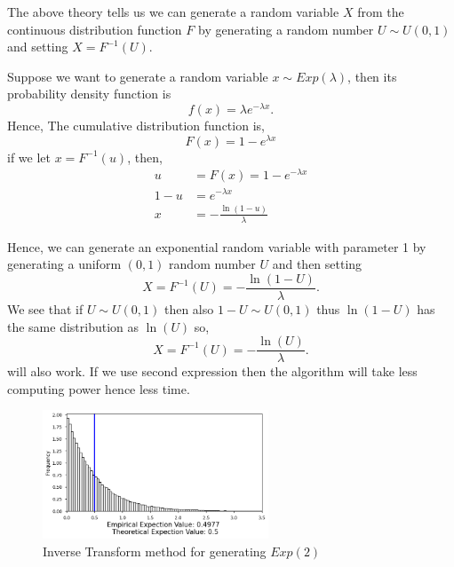 The above theory tells us we can generate a random variable $X$ from the continuous distribution function  $F$ by generating a random number $U\sim U(0,1)$
and setting $X=F^{-1}(U)$.

\begin{example}
	\label{exponential distribution}
	Suppose we want to generate a random variable $x\sim Exp(\lambda)$, then its probability density function is
	\[
		f(x) = \lambda e^{-\lambda x}.
	\]
	Hence, The cumulative distribution function is,
	\[
		F(x) = 1-e^{\lambda x}
	\]
	if we let $x=F^{-1}(u)$, then,
	\begin{align*}
		u   & =F(x)=1-e^{-\lambda x}       \\
		1-u & = e ^{-\lambda x}            \\
		x   & = - \frac{\ln(1-u)}{\lambda}
	\end{align*}

	Hence, we can generate an exponential random variable with parameter 1 by generating a uniform $(0,1)$ random number $U$ and then setting
	\[
		X = F^{-1}(U) = -\frac{\ln(1-U)}{\lambda}.
	\]
	We see that if $U\sim U(0,1)$ then also $1-U\sim U(0,1)$ thus  $\ln(1-U)$ has the same distribution as  $\ln(U)$ so,
	\[
		X = F^{-1}(U) = -\frac{\ln(U)}{\lambda}.
	\]
	will also work. If we use second expression then the algorithm will take less computing power hence less time.
	\begin{figure}[H]

		\centering
		\includegraphics[width=0.6\textwidth]{images/exp_ITA.png}
		\caption{Inverse Transform method for generating $Exp(2)$}
	\end{figure}
\end{example}
